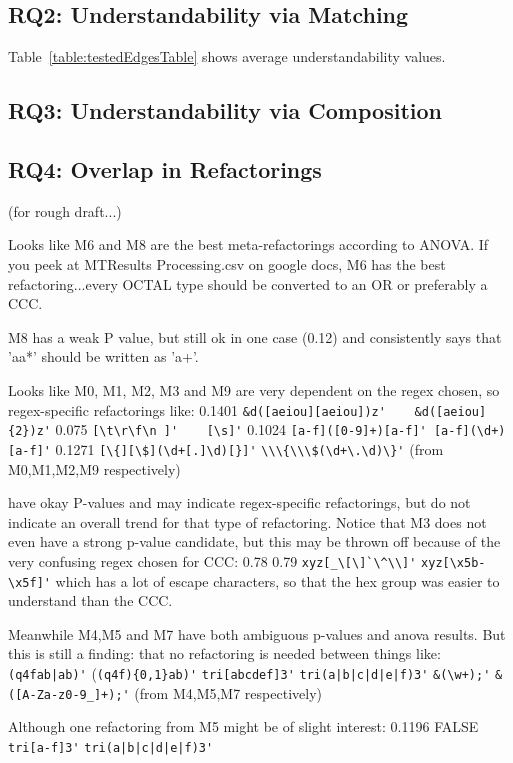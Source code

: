 \subsection{RQ2: Understandability via Matching}
Table~\ref{table:testedEdgesTable} shows average understandability values. 




\subsection{RQ3: Understandability via Composition}

\subsection{RQ4: Overlap in Refactorings}


(for rough draft...)

Looks like M6 and M8 are the best meta-refactorings according to ANOVA.
If you peek at MTResults Processing.csv on google docs, M6 has the best refactoring...every OCTAL type should be converted to an OR or preferably a CCC.

M8 has a weak P value, but still ok in one case (0.12) and consistently says that 'aa*' should be written as 'a+'.

Looks like M0, M1, M2, M3 and M9 are very dependent on the regex chosen, so regex-specific refactorings like:
0.1401 \verb!&d([aeiou][aeiou])z'    &d([aeiou]{2})z'!
0.075   \verb![\t\r\f\n ]'    [\s]'!
0.1024  \verb![a-f]([0-9]+)[a-f]' [a-f](\d+)[a-f]'!
0.1271  \verb![\{][\$](\d+[.]\d)[}]'!
\verb!\\\{\\\$(\d+\.\d)\}'!
(from M0,M1,M2,M9 respectively)

have okay P-values and may indicate regex-specific refactorings, but do not indicate an overall trend for that type of refactoring.
Notice that M3 does not even have a strong p-value candidate, but this may be thrown off because of the very confusing regex chosen for CCC:
0.78    0.79
\verb!xyz[_\[\]`\^\\]'!    \verb!xyz[\x5b-\x5f]'!
which has a lot of escape characters, so that the hex group was easier to understand than the CCC.



Meanwhile M4,M5 and M7 have both ambiguous p-values and anova results.  But this is still a finding: that no refactoring is needed between things like:
\verb!(q4fab|ab)'! (\verb!(q4f){0,1}ab)'!
\verb!tri[abcdef]3'!   \verb!tri(a|b|c|d|e|f)3'!
\verb!&(\w+);'!    \verb!&([A-Za-z0-9_]+);'!
(from M4,M5,M7 respectively)

Although one refactoring from M5 might be of slight interest:
0.1196  FALSE   \verb!tri[a-f]3'!  \verb!tri(a|b|c|d|e|f)3'!

